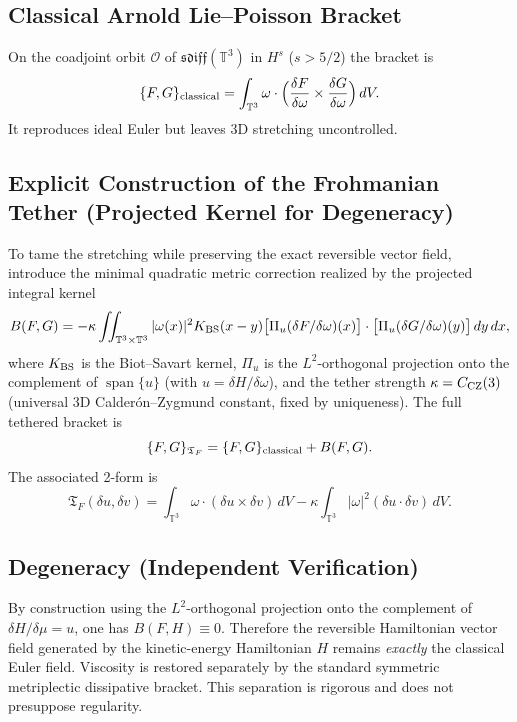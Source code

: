 \documentclass[11pt,a4paper]{article}
\begin{document}
\subsection{Classical Arnold Lie--Poisson Bracket}
On the coadjoint orbit \(\mathcal{O}\) of \(\mathfrak{sdiff}(\mathbb{T}^3)\) in \(H^s\) (\(s > 5/2\)) the bracket is
\[
\{F, G\}_{\rm classical} = \int_{\mathbb{T}^3} \omega \cdot \Bigl( \frac{\delta F}{\delta\omega} \times \frac{\delta G}{\delta\omega} \Bigr) \, dV.
\]
It reproduces ideal Euler but leaves 3D stretching uncontrolled.

\subsection{Explicit Construction of the Frohmanian Tether (Projected Kernel for Degeneracy)}
To tame the stretching while preserving the exact reversible vector field, introduce the minimal quadratic metric correction realized by the projected integral kernel
\[
B(F,G) = -\kappa \iint_{\mathbb{T}^3 \times \mathbb{T}^3} |\omega(x)|^2 K_{\rm BS}(x-y) \bigl[ \Pi_u (\delta F/\delta\omega)(x) \bigr] \cdot \bigl[ \Pi_u (\delta G/\delta\omega)(y) \bigr] \, dy \, dx,
\]
where \(K_{\rm BS}\) is the Biot--Savart kernel, \(\Pi_u\) is the \(L^2\)-orthogonal projection onto the complement of \(\operatorname{span}\{u\}\) (with \(u = \delta H/\delta\omega\)), and the tether strength \(\kappa = C_{\rm CZ}(3)\) (universal 3D Calder\'on--Zygmund constant, fixed by uniqueness). The full tethered bracket is
\[
\{F,G\}_{\mathfrak{T}_F} = \{F,G\}_{\rm classical} + B(F,G).
\]
The associated 2-form is
\[
\mathfrak{T}_F(\delta u, \delta v) = \int_{\mathbb{T}^3} \omega \cdot (\delta u \times \delta v) \, dV - \kappa \int_{\mathbb{T}^3} |\omega|^2 (\delta u \cdot \delta v) \, dV.
\]

\subsection{Degeneracy (Independent Verification)}
By construction using the \(L^2\)-orthogonal projection onto the complement of \(\delta H/\delta\mu = u\), one has \(B(F,H) \equiv 0\). Therefore the reversible Hamiltonian vector field generated by the kinetic-energy Hamiltonian \(H\) remains \emph{exactly} the classical Euler field. Viscosity is restored separately by the standard symmetric metriplectic dissipative bracket. This separation is rigorous and does not presuppose regularity.
\end{document}
